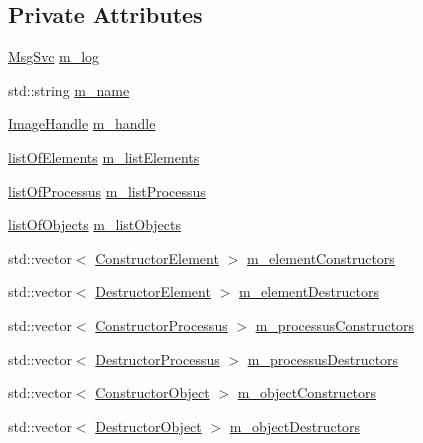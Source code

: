 \subsection*{Private Attributes}
\begin{DoxyCompactItemize}
\item 
\hyperlink{classMsgSvc}{Msg\+Svc} \hyperlink{classDLL_a6e66cd993e2d142b48691557ce8e4047}{m\+\_\+log}
\item 
std\+::string \hyperlink{classDLL_ad5e4d36d8c2575447f73acc2a703b405}{m\+\_\+name}
\item 
\hyperlink{classDLL_addaefe5c907a5f357cc18718300f22b0}{Image\+Handle} \hyperlink{classDLL_a2ca22015aef35c5d61f8daaf3c070154}{m\+\_\+handle}
\item 
\hyperlink{classDLL_a36792635c3cd36adbaaef2ff7152046e}{list\+Of\+Elements} \hyperlink{classDLL_a2e88d7167245fd7b6a000817583643ed}{m\+\_\+list\+Elements}
\item 
\hyperlink{classDLL_aded1b0bb41b288ed4f34cb6d6632d486}{list\+Of\+Processus} \hyperlink{classDLL_a197e92b990184a27a74f4a0456897bd5}{m\+\_\+list\+Processus}
\item 
\hyperlink{classDLL_a68629aa6f9103c5a3082511ff8218b1e}{list\+Of\+Objects} \hyperlink{classDLL_af48201f52f29a849489e0104a440bcbb}{m\+\_\+list\+Objects}
\item 
std\+::vector$<$ \hyperlink{classDLL_a104a81e667f9a54504c0faf095f77fc7}{Constructor\+Element} $>$ \hyperlink{classDLL_a7ee65d305f4f6014f6499d69f162d024}{m\+\_\+element\+Constructors}
\item 
std\+::vector$<$ \hyperlink{classDLL_a204f0c776712969410a2673db3d98cf5}{Destructor\+Element} $>$ \hyperlink{classDLL_a5004587b4dac5d0ccb0ab99b167ef159}{m\+\_\+element\+Destructors}
\item 
std\+::vector$<$ \hyperlink{classDLL_afbf4c85f3517962642944b80833a3607}{Constructor\+Processus} $>$ \hyperlink{classDLL_af9b49d23b767b742e38a7286de8e7c4d}{m\+\_\+processus\+Constructors}
\item 
std\+::vector$<$ \hyperlink{classDLL_a203a61b2a683e2751b5f3fe5a7187a7e}{Destructor\+Processus} $>$ \hyperlink{classDLL_a5a00cc3723ff34be55c621505f15fc08}{m\+\_\+processus\+Destructors}
\item 
std\+::vector$<$ \hyperlink{classDLL_a67b9601085a9f972b9ac6876cd11398e}{Constructor\+Object} $>$ \hyperlink{classDLL_a298d605445e22ef8147ae700848cd737}{m\+\_\+object\+Constructors}
\item 
std\+::vector$<$ \hyperlink{classDLL_a4400d330cd793ae5f883ffa58384f637}{Destructor\+Object} $>$ \hyperlink{classDLL_a8c34d91e0a5ccfc34fff7c66f542b2d7}{m\+\_\+object\+Destructors}
\end{DoxyCompactItemize}


